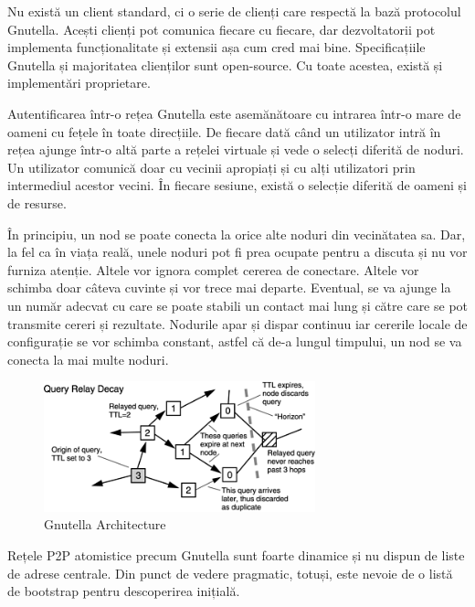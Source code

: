 Nu există un client standard, ci o serie de clienți care respectă la bază
protocolul Gnutella. Acești clienți pot comunica fiecare cu fiecare, dar
dezvoltatorii pot implementa funcționalitate și extensii așa cum cred mai
bine. Specificațiile Gnutella și majoritatea clienților sunt open-source. Cu
toate acestea, există și implementări proprietare.

Autentificarea într-o rețea Gnutella este asemănătoare cu intrarea într-o mare
de oameni cu fețele în toate direcțiile. De fiecare dată când un utilizator
intră în rețea ajunge într-o altă parte a rețelei virtuale și vede o selecți
diferită de noduri. Un utilizator comunică doar cu vecinii apropiați și cu
alți utilizatori prin intermediul acestor vecini. În fiecare sesiune, există o
selecție diferită de oameni și de resurse.

În principiu, un nod se poate conecta la orice alte noduri din vecinătatea sa.
Dar, la fel ca în viața reală, unele noduri pot fi prea ocupate pentru a
discuta și nu vor furniza atenție. Altele vor ignora complet cererea de
conectare. Altele vor schimba doar câteva cuvinte și vor trece mai departe.
Eventual, se va ajunge la un număr adecvat cu care se poate stabili un contact
mai lung și către care se pot transmite cereri și rezultate. Nodurile apar și
dispar continuu iar cererile locale de configurație se vor schimba constant,
astfel că de-a lungul timpului, un nod se va conecta la mai multe noduri.

\begin{figure}
  \centering
  \includegraphics[width=0.7\textwidth]{src/img/p2p-systems/gnutella}
  \caption{Gnutella Architecture}
  \label{fig:p2p-systems:gnutella}
\end{figure}

Rețele P2P atomistice precum Gnutella sunt foarte dinamice și nu dispun de
liste de adrese centrale. Din punct de vedere pragmatic, totuși, este nevoie
de o listă de bootstrap pentru descoperirea inițială.

